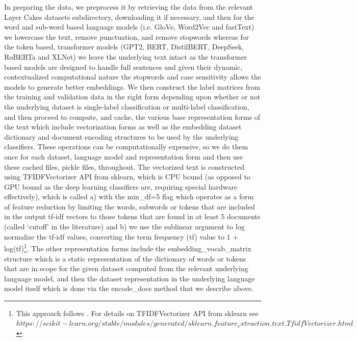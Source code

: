 \documentclass[final]{clv2025}
\begin{document}
In preparing the data, we preprocess it by retrieving the data from the relevant Layer Cakes datasets subdirectory, downloading it if necessary, and then for the word and sub-word based language models (i.e. GloVe, Word2Vec and fastText) we lowercase the text, remove punctuation, and remove stopwords whereas for the token based, transformer models (GPT2, BERT, DistilBERT, DeepSeek, RoBERTa and XLNet) we leave the underlying text intact as the transformer based models are designed to handle full sentences and given their dynamic, contextualized computational nature the stopwords and case sensitivity allows the models to generate better embeddings. We then construct the label matrices from the training and validation data in the right form depending upon whether or not the underlying dataset is single-label classification or multi-label classification, and then proceed to compute, and cache, the various base representation forms of the text which include vectorization forms as well as the embedding dataset dictionary and document encoding structures to be used by the underlying classifiers. These operations can be computationally expensive, so we do them once for each dataset, language model and representation form and then use these cached files, pickle files, throughout. 
The vectorized text is constructed using TFIDFVectorizer API from sklearn, which is CPU bound (as opposed to GPU bound as the deep learning classifiers are, requiring special hardware effectively), which is called a) with the min\_df=5 flag which operates as a form of feature reduction by limiting the words, subwords or tokens that are included in the output tf-idf vectors to those tokens that are found in at least 5 documents (called ‘cutoff’ in the literature) and b) we use the sublinear argument to log normalize the tf-idf values, converting the term frequency (tf) value to 1 + log(tf)\footnote{This approach follows \cite{moreo}. For details on TFIDFVectorizer API from sklearn see $https://scikit-learn.org/stable/modules/generated/sklearn.feature_extraction.text.TfidfVectorizer.html$}. The other representation forms include the embedding\_vocab\_matrix structure which is a static representation of the dictionary of words or tokens that are in scope for the given dataset computed from the relevant underlying language model, and then the dataset representation in the underlying language model itself which is done via the encode\_docs method that we describe above. 
\end{document}
